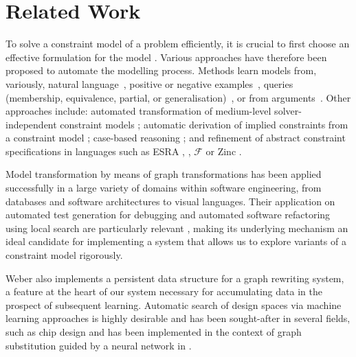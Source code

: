 \section{Related Work}

To solve a constraint model of a problem efficiently, it is crucial to first choose an effective formulation for the model \cite{freuder2018:progress}.
Various approaches have therefore been proposed to automate the modelling process.
Methods learn models from, variously,
natural language~\cite{Kiziltan2016:constraint},
positive or negative examples~\cite{DeRaedt2018:learning,Bessiere2017:constraint,Arcangioli2016:multiple},
queries (membership, equivalence, partial, or generalisation)~\cite{Beldiceanu2012:model,Bessiere2013:constraint,Bessiere2014:boosting}, or
from arguments~\cite{Shchekotykhin2009:argumentation}.
Other approaches include:
automated transformation of medium-level solver-independent constraint models \cite{Rendl2010:thesis,Nethercote2007:minizinc,OPLBook,Mills1999:eacl,Nightingale2014:automatically,savilerow,Nightingale2015:automatically};
automatic derivation of implied constraints from a constraint model \cite{frisch2003:cgrass,colton2001:constraint,charnley2006:automatic,Bessiere2007:learning,Leo2013:globalizing};
case-based reasoning \cite{Little2003:using}; and
refinement of abstract constraint specifications \cite{Frisch2005:rules} in languages such as ESRA \cite{Flener2003:esra}, \essence \cite{frisch2008:essence}, ${\mathcal F}$ \cite{Hnich2003:function} or Zinc \cite{marriott2008:design,ZincModref10,Rafeh2016:linzinc}.

Model transformation by means of graph transformations \cite{mens2005use} has been applied successfully in a large variety of domains within software engineering, from databases and software architectures to visual languages\cite{kahani2019survey,taentzer2005model}.
Their application on automated test generation for debugging \cite{troya2022model} and automated software refactoring using local search are particularly relevant \cite{qayum2009local},
making its underlying mechanism an ideal candidate for implementing a system that allows us to explore variants of a constraint model rigorously.

Weber \cite{weber2022tool} also implements a persistent data structure for a graph rewriting system, a feature at the heart of our system necessary for accumulating data in the prospect of subsequent learning. Automatic search of design spaces via machine learning approaches is highly desirable and has been sought-after in several fields, such as chip design \cite{hu2020machine} and has been implemented in the context of graph substitution guided by a neural network in \cite{jia2019taso}.

